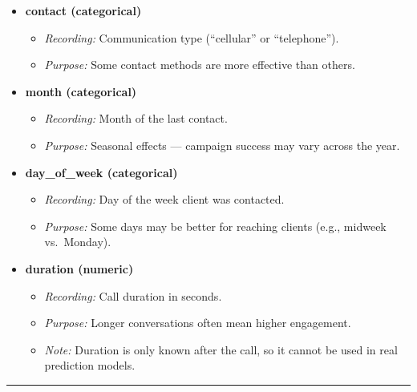\documentclass[
]{article}
\providecommand{\tightlist}{%
  \setlength{\itemsep}{0pt}\setlength{\parskip}{0pt}}
\begin{document}
\begin{itemize}
\tightlist
\item
  \textbf{contact (categorical)}

  \begin{itemize}
  \tightlist
  \item
    \emph{Recording:} Communication type (``cellular'' or
    ``telephone'').\\
  \item
    \emph{Purpose:} Some contact methods are more effective than others.
  \end{itemize}
\item
  \textbf{month (categorical)}

  \begin{itemize}
  \tightlist
  \item
    \emph{Recording:} Month of the last contact.\\
  \item
    \emph{Purpose:} Seasonal effects --- campaign success may vary
    across the year.
  \end{itemize}
\item
  \textbf{day\_of\_week (categorical)}

  \begin{itemize}
  \tightlist
  \item
    \emph{Recording:} Day of the week client was contacted.\\
  \item
    \emph{Purpose:} Some days may be better for reaching clients (e.g.,
    midweek vs.~Monday).
  \end{itemize}
\item
  \textbf{duration (numeric)}

  \begin{itemize}
  \tightlist
  \item
    \emph{Recording:} Call duration in seconds.\\
  \item
    \emph{Purpose:} Longer conversations often mean higher engagement.\\
  \item
    \emph{Note:} Duration is only known after the call, so it cannot be
    used in real prediction models.
  \end{itemize}
\end{itemize}

\begin{center}\rule{0.5\linewidth}{0.5pt}\end{center}
\end{document}

